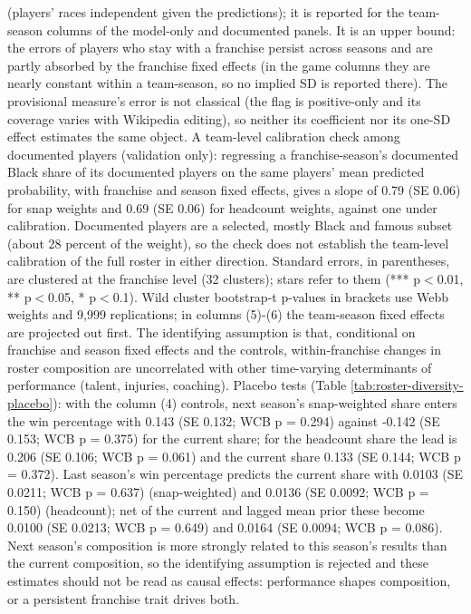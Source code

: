 \begin{table}[!h]
{\begin{threeparttable}
\begin{tablenotes}[para]
(players' races independent given the predictions); it is reported for the team-season columns of the model-only and documented panels. It is an upper bound: the errors of players who stay with a franchise persist across seasons and are partly absorbed by the franchise fixed effects (in the game columns they are nearly constant within a team-season, so no implied SD is reported there). The provisional measure's error is not classical (the flag is positive-only and its coverage varies with Wikipedia editing), so neither its coefficient nor its one-SD effect estimates the same object. A team-level calibration check among documented players (validation only): regressing a franchise-season's documented Black share of its documented players on the same players' mean predicted probability, with franchise and season fixed effects, gives a slope of 0.79 (SE 0.06) for snap weights and  0.69 (SE 0.06) for headcount weights, against one under calibration. Documented players are a selected, mostly Black and famous subset (about 28 percent of the weight), so the check does not establish the team-level calibration of the full roster in either direction. Standard errors, in parentheses, are clustered at the franchise level (32 clusters); stars refer to them (*** p$<$0.01, ** p$<$0.05, * p$<$0.1). Wild cluster bootstrap-t p-values in brackets use Webb weights and 9,999 replications; in columns (5)-(6) the team-season fixed effects are projected out first. The identifying assumption is that, conditional on franchise and season fixed effects and the controls, within-franchise changes in roster composition are uncorrelated with other time-varying determinants of performance (talent, injuries, coaching). Placebo tests (Table \ref{tab:roster-diversity-placebo}): with the column (4) controls, next season's snap-weighted share enters the win percentage with 0.143 (SE 0.132; WCB p = 0.294) against -0.142 (SE 0.153; WCB p = 0.375) for the current share; for the headcount share the lead is 0.206 (SE 0.106; WCB p = 0.061) and the current share 0.133 (SE 0.144; WCB p = 0.372). Last season's win percentage predicts the current share with 0.0103 (SE 0.0211; WCB p = 0.637) (snap-weighted) and 0.0136 (SE 0.0092; WCB p = 0.150) (headcount); net of the current and lagged mean prior these become 0.0100 (SE 0.0213; WCB p = 0.649) and 0.0164 (SE 0.0094; WCB p = 0.086). Next season's composition is more strongly related to this season's results than the current composition, so the identifying assumption is rejected and these estimates should not be read as causal effects: performance shapes composition, or a persistent franchise trait drives both.
\end{tablenotes}
\end{threeparttable}}
\end{table}
